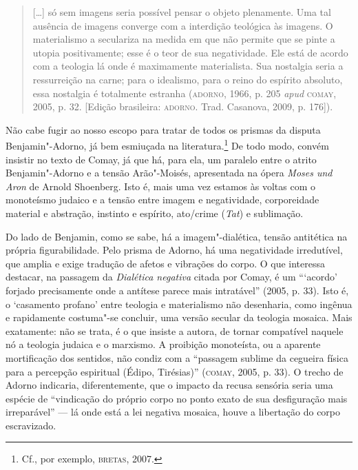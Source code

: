 \begin{quote}
{[}\ldots{}{]} só sem imagens seria possível pensar o objeto plenamente. Uma
tal ausência de imagens converge com a interdição teológica às imagens.
O materialismo a seculariza na medida em que não permite que se pinte a
utopia positivamente; esse é o teor de sua negatividade. Ele está de
acordo com a teologia lá onde é maximamente materialista. Sua nostalgia
seria a ressurreição na carne; para o idealismo, para o reino do
espírito absoluto, essa nostalgia é totalmente estranha (\textsc{adorno}, 1966,
p. 205 \emph{apud} \textsc{comay}, 2005, p. 32. {[}Edição brasileira: \textsc{adorno}. Trad. Casanova, 2009, p. 176{]}).
\end{quote}

Não cabe fugir ao nosso escopo para tratar de todos os prismas da
disputa Benjamin"-Adorno, já bem esmiuçada na literatura.\footnote{Cf.,
  por exemplo, \textsc{bretas}, 2007.} De todo modo, convém insistir no
texto de Comay, já que há, para ela, um paralelo entre o atrito
Benjamin"-Adorno e a tensão Arão"-Moisés, apresentada na ópera \emph{Moses
und Aron} de Arnold Shoenberg. Isto é, mais uma vez estamos às voltas
com o monoteísmo judaico e a tensão entre imagem e negatividade,
corporeidade material e abstração, instinto e espírito, ato/crime
(\emph{Tat}) e sublimação.

Do lado de Benjamin, como se sabe, há a imagem"-dialética, tensão
antitética na própria figurabilidade. Pelo prisma de Adorno, há uma
negatividade irredutível, que amplia e exige tradução de afetos e
vibrações do corpo. O que interessa destacar, na passagem da
\emph{Dialética negativa} citada por Comay, é um ```acordo'
forjado precisamente onde a antítese parece mais intratável'' (2005, p. 33).
Isto é, o `casamento profano' entre teologia e materialismo não
desenharia, como ingênua e rapidamente costuma"-se concluir, uma versão
secular da teologia mosaica. Mais exatamente: não se trata, é o que
insiste a autora, de tornar compatível naquele nó a teologia judaica e o
marxismo. A proibição monoteísta, ou a aparente mortificação dos
sentidos, não condiz com a ``passagem sublime da cegueira física para a
percepção espiritual (Édipo, Tirésias)'' (\textsc{comay}, 2005, p. 33). O trecho
de Adorno indicaria, diferentemente, que o impacto da recusa sensória
seria uma espécie de ``vindicação do próprio corpo no ponto exato de sua
desfiguração mais irreparável'' --- lá onde está a lei negativa mosaica,
houve a libertação do corpo escravizado.

